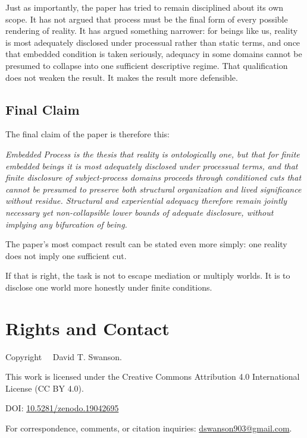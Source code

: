 \documentclass[11pt]{article}
\renewenvironment{quote}
  {\list{}{\leftmargin=1.4em \rightmargin=1.0em}%
   \item\relax\color{softink}\itshape}
  {\endlist}
\begin{document}
Just as importantly, the paper has tried to remain disciplined about its own scope. It has not argued that process must be the final form of every possible rendering of reality. It has argued something narrower: for beings like us, reality is most adequately disclosed under processual rather than static terms, and once that embedded condition is taken seriously, adequacy in some domains cannot be presumed to collapse into one sufficient descriptive regime. That qualification does not weaken the result. It makes the result more defensible.

\subsection{Final Claim}

The final claim of the paper is therefore this:

\begin{quote}
Embedded Process is the thesis that reality is ontologically one, but that for finite embedded beings it is most adequately disclosed under processual terms, and that finite disclosure of subject-process domains proceeds through conditioned cuts that cannot be presumed to preserve both structural organization and lived significance without residue. Structural and experiential adequacy therefore remain jointly necessary yet non-collapsible lower bounds of adequate disclosure, without implying any bifurcation of being.
\end{quote}

The paper's most compact result can be stated even more simply: one reality does not imply one sufficient cut.

If that is right, the task is not to escape mediation or multiply worlds. It is to disclose one world more honestly under finite conditions.

\appendix



\section*{Rights and Contact}

\noindent Copyright \textcopyright\ \the\year\ David T. Swanson.

\noindent This work is licensed under the Creative Commons Attribution 4.0 International License (CC BY 4.0).

\noindent DOI: \href{https://doi.org/10.5281/zenodo.19042695}{10.5281/zenodo.19042695}

\noindent For correspondence, comments, or citation inquiries: \href{mailto:dswanson903@gmail.com}{dswanson903@gmail.com}.
\end{document}
